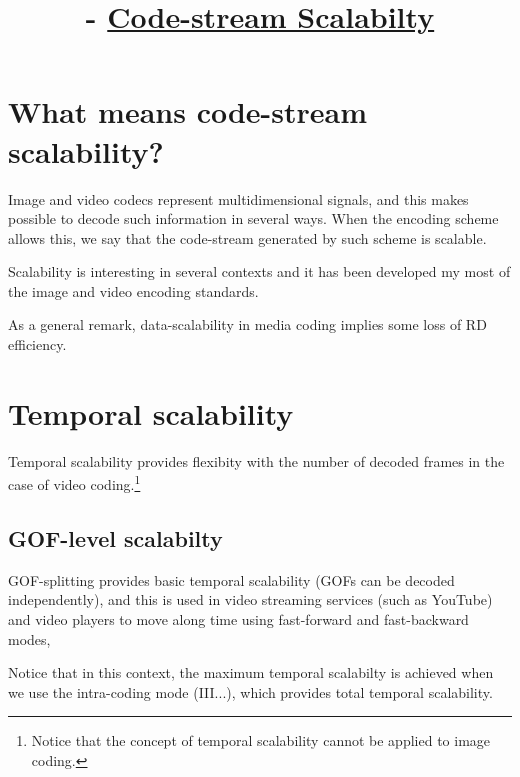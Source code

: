 


\title{\SM{} -  \href{https://github.com/Sistemas-Multimedia/Sistemas-Multimedia.github.io/tree/master/contents/data_scalability}{Code-stream Scalabilty}}

\maketitle
\tableofcontents

\section{What means code-stream scalability?}

Image and video codecs represent multidimensional signals, and this
makes possible to decode such information in several ways. When the
encoding scheme allows this, we say that the code-stream generated by
such scheme is scalable.

Scalability is interesting in several contexts and it has been
developed my most of the image and video encoding standards.

As a general remark, data-scalability in media coding implies some
loss of RD efficiency.


\section{Temporal scalability~\cite{vruiz__video_scalability}}


Temporal scalability provides flexibity with the number of decoded
frames in the case of video coding.\footnote{Notice that the concept
  of temporal scalability cannot be applied to image coding.}

\subsection{GOF-level scalabilty}
GOF-splitting provides basic temporal scalability (GOFs can be decoded
independently), and this is used in video streaming services (such as
YouTube) and video players to move along time using fast-forward and
fast-backward modes,
  
Notice that in this context, the maximum temporal scalabilty is
achieved when we use the intra-coding mode (III...), which provides
total temporal scalability.

